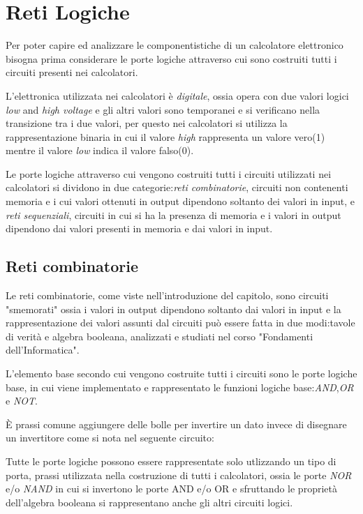 \chapter{Reti Logiche}
Per poter capire ed analizzare le componentistiche di un calcolatore elettronico
bisogna prima considerare le porte logiche attraverso cui sono costruiti tutti i
circuiti presenti nei calcolatori.

L'elettronica utilizzata nei calcolatori è \emph{digitale}, ossia opera con due valori
logici \emph{low} and \emph{high voltage} e gli altri valori sono temporanei e si
verificano nella transizione tra i due valori, per questo nei calcolatori si utilizza
la rappresentazione binaria in cui il valore \emph{high} rappresenta un valore vero(1)
mentre il valore \emph{low} indica il valore falso(0).

Le porte logiche attraverso cui vengono costruiti tutti i circuiti utilizzati nei calcolatori
si dividono in due categorie:\emph{reti combinatorie}, circuiti non contenenti memoria
e i cui valori ottenuti in output dipendono soltanto dei valori in input, e \emph{reti sequenziali},
circuiti in cui si ha la presenza di memoria e i valori in output dipendono dai valori
presenti in memoria e dai valori in input.


\section{Reti combinatorie}
Le reti combinatorie, come viste nell'introduzione del capitolo, sono circuiti "smemorati"
ossia i valori in output dipendono soltanto dai valori in input e la rappresentazione
dei valori assunti dal circuiti può essere fatta in due modi:tavole di verità e algebra booleana,
analizzati e studiati nel corso "Fondamenti dell'Informatica".

L'elemento base secondo cui vengono costruite tutti i circuiti sono le porte logiche base,
in cui viene implementato e rappresentato le funzioni logiche base:\emph{AND},\emph{OR} e \emph{NOT}.

È prassi comune aggiungere delle bolle per invertire un dato invece di disegnare un invertitore
come si nota nel seguente circuito:

Tutte le porte logiche possono essere rappresentate solo utlizzando un tipo di porta,
prassi utilizzata nella costruzione di tutti i calcolatori, ossia le porte \emph{NOR} e/o \emph{NAND}
in cui si invertono le porte AND e/o OR e sfruttando le proprietà dell'algebra booleana
si rappresentano anche gli altri circuiti logici.

